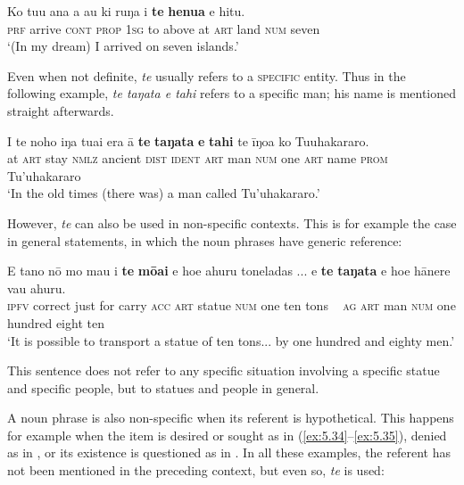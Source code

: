 \ea\label{ex:5.31}
\gll Ko tu{\ꞌ}u {\ꞌ}ana a au ki ruŋa i \textbf{te} \textbf{henua} e hitu. \\
\textsc{prf} arrive \textsc{cont} \textsc{prop} \textsc{1sg} to above at \textsc{art} land \textsc{num} seven \\

\glt
‘(In my dream) I arrived on seven islands.’ \textstyleExampleref{[R420.014]} 
\z

Even when not definite, \textit{te} usually refers to a \textsc{specific} entity. Thus in the following example, \textit{te taŋata e tahi} refers to a specific man; his name is mentioned straight afterwards.

\ea\label{ex:5.32}
\gll {\ꞌ}I te noho iŋa tuai era {\ꞌ}ā \textbf{te} \textbf{taŋata} \textbf{e} \textbf{tahi} te {\ꞌ}īŋoa  ko Tu{\ꞌ}uhakararo.\\
at \textsc{art} stay \textsc{nmlz} ancient \textsc{dist} \textsc{ident} \textsc{art} man \textsc{num} one \textsc{art} name  \textsc{prom} Tu’uhakararo\\

\glt
‘In the old times (there was) a man called Tu’uhakararo.’ \textstyleExampleref{[R477.002]} 
\z

However, \textit{te} can also be used in non-specific contexts. This is for example the case in general statements, in which the noun phrases have generic reference:

\ea\label{ex:5.33}
\gll E tano nō mo ma{\ꞌ}u i \textbf{te} \textbf{mōai} e ho{\ꞌ}e {\ꞌ}ahuru toneladas ...  e \textbf{te} \textbf{taŋata} e ho{\ꞌ}e hānere va{\ꞌ}u {\ꞌ}ahuru.\\
\textsc{ipfv} correct just for carry \textsc{acc} \textsc{art} statue \textsc{num} one ten tons ~   \textsc{ag} \textsc{art} man \textsc{num} one hundred eight ten\\

\glt
‘It is possible to transport a statue of ten tons... by one hundred and eighty men.’ \textstyleExampleref{[R376.062]} 
\z

This sentence does not refer to any specific situation involving a specific statue and specific people, but to statues and people in general. 

A noun phrase is also non-specific when its referent is hypothetical. This happens for example when the item is desired or sought as in (\ref{ex:5.34}–\ref{ex:5.35}), denied as in , or its existence is questioned as in . In all these examples, the referent has not been mentioned in the preceding context, but even so, \textit{te} is used:

